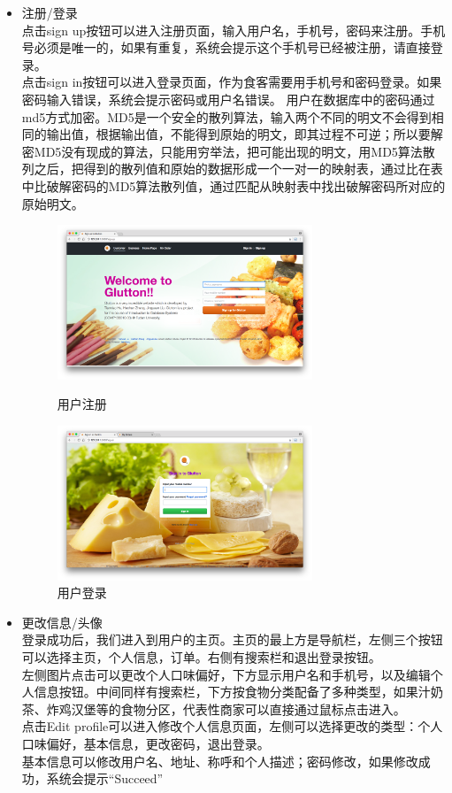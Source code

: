 \documentclass[12pt, oneside,a4paper]{article}
\begin{document}
  \begin{itemize}
  \item 注册/登录\\
  点击sign up按钮可以进入注册页面，输入用户名，手机号，密码来注册。手机号必须是唯一的，如果有重复，系统会提示这个手机号已经被注册，请直接登录。\\
  点击sign in按钮可以进入登录页面，作为食客需要用手机号和密码登录。如果密码输入错误，系统会提示密码或用户名错误。
  用户在数据库中的密码通过md5方式加密。MD5是一个安全的散列算法，输入两个不同的明文不会得到相同的输出值，根据输出值，不能得到原始的明文，即其过程不可逆；所以要解密MD5没有现成的算法，只能用穷举法，把可能出现的明文，用MD5算法散列之后，把得到的散列值和原始的数据形成一个一对一的映射表，通过比在表中比破解密码的MD5算法散列值，通过匹配从映射表中找出破解密码所对应的原始明文。
  \begin{figure}[H]
   \begin{minipage}[t]{0.5\linewidth}
    \centering
     \includegraphics[width=3in]{cu-signup.jpg}
     \caption{\small{用户注册}}
   \end{minipage}
   \begin{minipage}[t]{0.5\linewidth}
    \centering
     \includegraphics[width=3in]{cu-signin.jpg}
      \caption{\small{用户登录}}
   \end{minipage}
   \end{figure}
  \item 更改信息/头像\\
  登录成功后，我们进入到用户的主页。主页的最上方是导航栏，左侧三个按钮可以选择主页，个人信息，订单。右侧有搜索栏和退出登录按钮。\\
  左侧图片点击可以更改个人口味偏好，下方显示用户名和手机号，以及编辑个人信息按钮。中间同样有搜索栏，下方按食物分类配备了多种类型，如果汁奶茶、炸鸡汉堡等的食物分区，代表性商家可以直接通过鼠标点击进入。\\
    点击Edit profile可以进入修改个人信息页面，左侧可以选择更改的类型：个人口味偏好，基本信息，更改密码，退出登录。\\
  基本信息可以修改用户名、地址、称呼和个人描述；密码修改，如果修改成功，系统会提示“Succeed”


\end{itemize}
\end{document}
